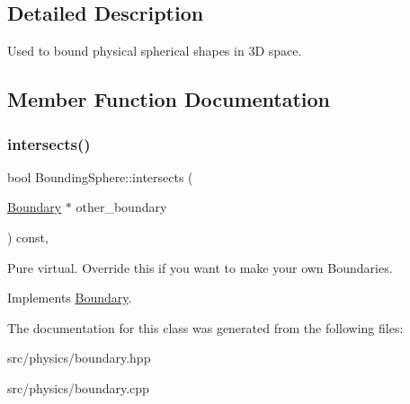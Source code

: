 \subsection{Detailed Description}
Used to bound physical spherical shapes in 3D space. 

\subsection{Member Function Documentation}
\mbox{\label{class_bounding_sphere_aab64d759fac6a9835ac24d6fca8530d6}} 
\subsubsection{\texorpdfstring{intersects()}{intersects()}}
{\footnotesize\ttfamily bool Bounding\+Sphere\+::intersects (\begin{DoxyParamCaption}\item[{\mbox{\hyperlink{class_boundary}{Boundary}} $\ast$}]{other\+\_\+boundary }\end{DoxyParamCaption}) const\hspace{0.3cm}{\ttfamily [override]}, {\ttfamily [virtual]}}

Pure virtual. Override this if you want to make your own Boundaries. 

Implements \mbox{\hyperlink{class_boundary_a364909bdfa4a4945f974c34a39e198cc}{Boundary}}.



The documentation for this class was generated from the following files\+:\begin{DoxyCompactItemize}
\item 
src/physics/boundary.\+hpp\item 
src/physics/boundary.\+cpp\end{DoxyCompactItemize}
